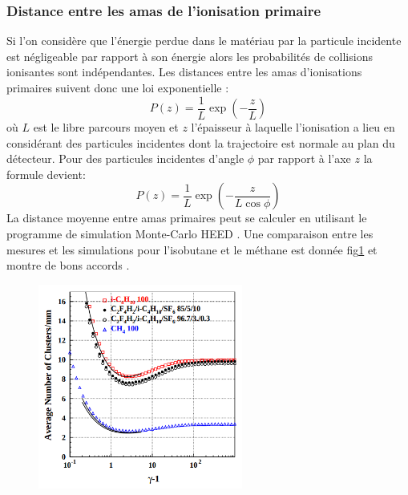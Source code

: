 \subsubsection{Distance entre les amas de l'ionisation primaire}
Si l'on considère que l'énergie perdue dans le matériau par la particule incidente est négligeable par rapport à son énergie alors les probabilités de collisions ionisantes sont indépendantes. Les distances entre les amas d'ionisations primaires suivent donc une loi exponentielle :
\begin{equation}
P(z)=\frac{1}{L}\exp\left(-\frac{z}{L}\right)
\end{equation} 
où $L$ est le libre parcours moyen et $z$ l'épaisseur à laquelle l'ionisation a lieu en considérant des particules incidentes dont la trajectoire est normale au plan du détecteur. Pour des particules incidentes d'angle $\phi$ par rapport à l'axe $z$ la formule devient:
\begin{equation}
P(z)=\frac{1}{L}\exp\left(-\frac{z}{L\cos\phi}\right)
\end{equation}
La distance moyenne entre amas primaires peut se calculer en utilisant le programme de simulation Monte-Carlo HEED \cite{HEED}. Une comparaison entre les mesures et les simulations pour l'isobutane et le méthane est donnée fig\ref{lambda} et montre de bons accords \cite{2004NIMPA}.  

\begin{figure}[ht!]
	\centering
	\includegraphics[width=0.60\textwidth]{RPC/lambda.png}
	\label{lambda}
\end{figure}


